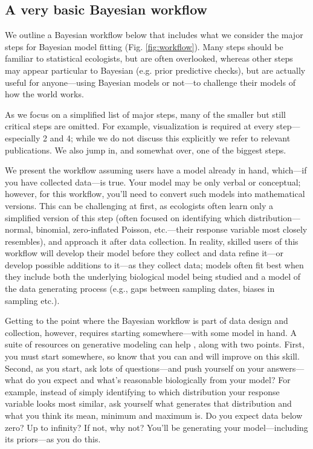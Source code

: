 \documentclass[11pt]{article}
\begin{document}
{\subsection{A very basic Bayesian workflow}

We outline a Bayesian workflow below that includes what we consider the major steps for Bayesian model fitting (Fig. \ref{fig:workflow}). Many steps should be familiar to statistical ecologists, but are often overlooked, whereas other steps may appear particular to Bayesian (e.g. prior predictive checks), but are actually useful for anyone---using Bayesian models or not---to challenge their models of how the world works. 

As we focus on a simplified list of major steps, many of the smaller but still critical steps are omitted. For example, visualization is required at every step---especially 2 and 4; while we do not discuss this explicitly we refer to relevant publications. We also jump in, and somewhat over, one of the biggest steps. 

We present the workflow assuming users have a model already in hand, which---if you have collected data---is true. Your model may be only verbal or conceptual; however, for this workflow, you'll need to convert such models into mathematical versions. This can be challenging at first, as ecologists often learn only a simplified version of this step (often focused on identifying which distribution---normal, binomial, zero-inflated Poisson, etc.---their response variable most closely resembles), and approach it after data collection. In reality, skilled users of this workflow will develop their model before they collect and data refine it---or develop possible additions to it---as they collect data; models often fit best when they include both the underlying biological model being studied and a model of the data generating process (e.g., gaps between sampling dates, biases in sampling etc.). 

Getting to the point where the Bayesian workflow is part of data design and collection, however, requires starting somewhere---with some model in hand. A suite of resources on generative modeling can help \citep{statrethink,betangen}, along with two points. First, you must start somewhere, so know that you can and will improve on this skill. Second, as you start, ask lots of questions---and push yourself on your answers---what do you expect and what's reasonable biologically from your model? For example, instead of simply identifying to which distribution your response variable looks most similar, ask yourself what generates that distribution and what you think its mean, minimum and maximum is. Do you expect data below zero? Up to infinity? If not, why not? You'll be generating your model---including its priors---as you do this. 

}
\end{document}

